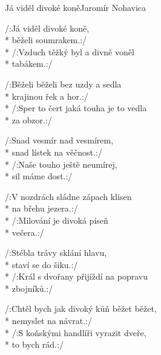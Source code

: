 \documentclass[10.5pt]{book}
\begin{document}
\begin{poem}{Já viděl divoké koně}{Jaromír Nohavica}

\settowidth{\versewidth}{Běželi běželi bez uzdy a sedla}

/:Já viděl divoké koně, \\*
běželi soumrakem.:/\\*
/:Vzduch těžký byl a divně voněl\\*
tabákem.:/

/:Běželi běželi bez uzdy a sedla\\*
krajinou řek a hor.:/\\*
/:Sper to čert jaká touha je to vedla\\*
za obzor.:/

/:Snad vesmír nad vesmírem, \\*
snad lístek na věčnost.:/\\*
/:Naše touho ještě neumírej, \\*
sil máme dost.:/

/:V nozdrách sládne zápach klisen \\*
na břehu jezera.:/\\*
/:Milování je divoká píseň \\*
večera.:/

/:Stébla trávy sklání hlavu, \\*
staví se do šiku.:/\\*
/:Král s dvořany přijíždí na popravu \\*
zbojníků.:/

/:Chtěl bych jak divoký kůň běžet běžet,\\* 
nemyslet na návrat.:/\\*
/:S koňskými handlíři vyrazit dveře, \\*
to bych rád.:/

\end{poem}
\iffalse
\end{document}
